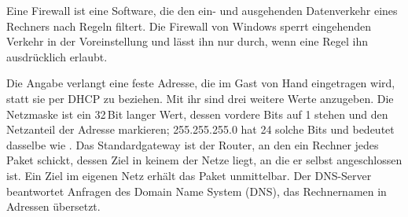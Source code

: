 Eine Firewall ist eine Software, die den ein- und ausgehenden Datenverkehr eines Rechners nach Regeln filtert. Die Firewall von Windows sperrt eingehenden Verkehr in der Voreinstellung und lässt ihn nur durch, wenn eine Regel ihn ausdrücklich erlaubt.

Die Angabe verlangt eine feste Adresse, die im Gast von Hand eingetragen wird, statt sie per DHCP zu beziehen. Mit ihr sind drei weitere Werte anzugeben. Die Netzmaske ist ein 32\,Bit langer Wert, dessen vordere Bits auf 1 stehen und den Netzanteil der Adresse markieren; 255.255.255.0 hat 24 solche Bits und bedeutet dasselbe wie . Das Standardgateway ist der Router, an den ein Rechner jedes Paket schickt, dessen Ziel in keinem der Netze liegt, an die er selbst angeschlossen ist. Ein Ziel im eigenen Netz erhält das Paket unmittelbar. Der DNS-Server beantwortet Anfragen des Domain Name System (DNS), das Rechnernamen in Adressen übersetzt.

